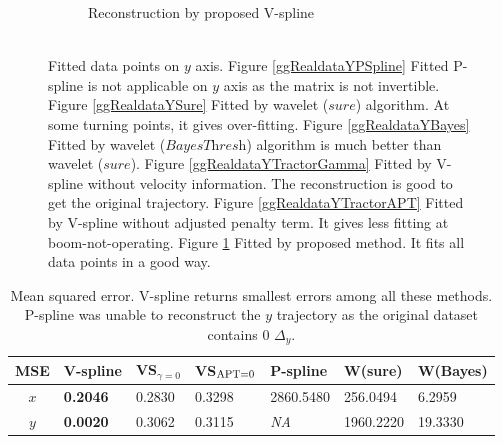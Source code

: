 \begin{figure}
\begin{subfigure}{0.45\textwidth}
    \caption{Reconstruction by proposed V-spline\\ \mbox{  }}\label{ggRealdataYTractor}
    \end{subfigure}
\caption{Fitted data points on $y$ axis. Figure \ref{ggRealdataYPSpline} Fitted P-spline is not applicable on $y$ axis as the matrix is not invertible. Figure \ref{ggRealdataYSure} Fitted by wavelet ($\textit{sure}$) algorithm. At some turning points, it gives over-fitting. Figure \ref{ggRealdataYBayes} Fitted by wavelet ($\textit{BayesThresh}$) algorithm is much better than wavelet ($\textit{sure}$). Figure \ref{ggRealdataYTractorGamma} Fitted by V-spline without velocity information. The reconstruction is good to get the original trajectory. Figure \ref{ggRealdataYTractorAPT} Fitted by V-spline without adjusted penalty term. It gives less fitting at boom-not-operating. Figure \ref{ggRealdataYTractor} Fitted by proposed method. It fits all data points in a good way.}\label{1dy}
 \end{figure}

\begin{table}
\caption{Mean squared error. V-spline returns smallest errors among all these methods. P-spline was unable to reconstruct the $y$ trajectory as the original dataset contains 0 $\Delta_y$.} \label{1dxymse}
	\setlength\tabcolsep{1.5pt}
\begin{center}
 	\begin{tabular}{|c|C{2cm}|C{2cm}|C{2cm}|C{2cm}|C{2cm}|C{2cm}|}
 		\hline
 		MSE   &  V-spline & VS$_{\gamma=0}$ & VS$_{\scriptsize \mbox{APT=0}}$  & P-spline &  W(sure) & W(Bayes)\\ \hline 
	\textit{$x$}   &  \textbf{0.2046} & 0.2830 & 0.3298     & 2860.5480   & 256.0494  & 6.2959  \\ \hline
	\textit{$y$}   &  \textbf{0.0020} & 0.3062 & 0.3115     & \textit{NA} & 1960.2220 & 19.3330  \\ \hline
 	\end{tabular}
 \end{center}
\end{table}

